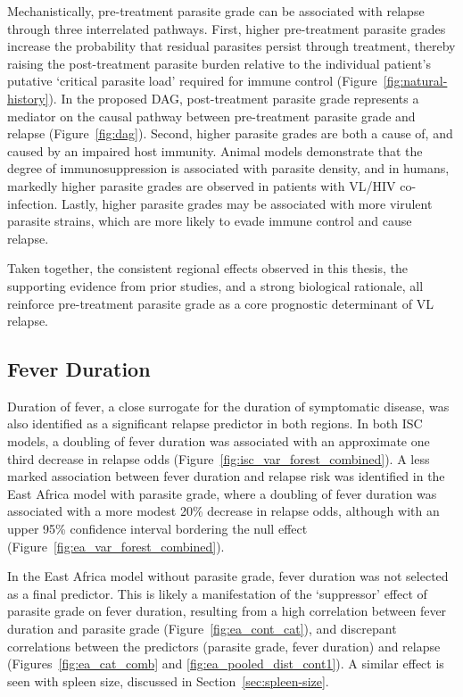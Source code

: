 Mechanistically, pre-treatment parasite grade can be associated with relapse through three interrelated pathways. First, higher pre-treatment parasite grades increase the probability that residual parasites persist through treatment, thereby raising the post-treatment parasite burden relative to the individual patient's putative `critical parasite load' required for immune control (Figure~\ref{fig:natural-history}). In the proposed DAG, post-treatment parasite grade represents a mediator on the causal pathway between pre-treatment parasite grade and relapse (Figure~\ref{fig:dag}). Second, higher parasite grades are both a cause of, and caused by an impaired host immunity. Animal models demonstrate that the degree of immunosuppression is associated with parasite density\cite{murray2002,bernardo2021}, and in humans, markedly higher parasite grades are observed in patients with VL/HIV co-infection\cite{takele2022,pareyn2025,burza2018}. Lastly, higher parasite grades may be associated with more virulent parasite strains, which are more likely to evade immune control and cause relapse\cite{rai2013}.

Taken together, the consistent regional effects observed in this thesis, the supporting evidence from prior studies, and a strong biological rationale, all reinforce pre-treatment parasite grade as a core prognostic determinant of VL relapse.

\subsection{Fever Duration\label{sec:fever_duration}}

Duration of fever, a close surrogate for the duration of symptomatic disease, was also identified as a significant relapse predictor in both regions. In both ISC models, a doubling of fever duration was associated with an approximate one third decrease in relapse odds (Figure~\ref{fig:isc_var_forest_combined}). A less marked association between fever duration and relapse risk was identified in the East Africa model with parasite grade, where a doubling of fever duration was associated with a more modest 20\% decrease in relapse odds, although with an upper 95\% confidence interval bordering the null effect (Figure~\ref{fig:ea_var_forest_combined}).

In the East Africa model without parasite grade, fever duration was not selected as a final predictor. This is likely a manifestation of the `suppressor' effect of parasite grade on fever duration, resulting from a high correlation between fever duration and parasite grade (Figure~\ref{fig:ea_cont_cat}), and discrepant correlations between the predictors (parasite grade, fever duration) and relapse (Figures~\ref{fig:ea_cat_comb} and \ref{fig:ea_pooled_dist_cont1})\cite{tu2008}. A similar effect is seen with spleen size, discussed in Section~\ref{sec:spleen-size}.

